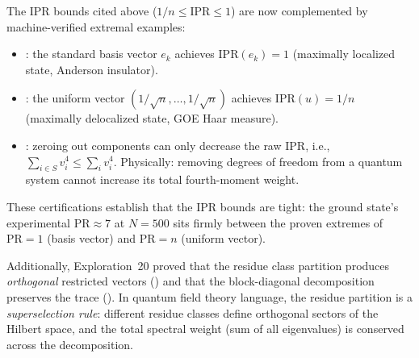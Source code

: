 \begin{remark}
The IPR bounds cited above ($1/n \leq \mathrm{IPR} \leq 1$) are
now complemented by machine-verified extremal examples:
\begin{itemize}
  \item {}: the standard basis vector $e_k$ achieves
    $\mathrm{IPR}(e_k) = 1$ (maximally localized state, Anderson insulator).
  \item {}: the uniform vector $(1/\sqrt{n}, \ldots, 1/\sqrt{n})$
    achieves $\mathrm{IPR}(u) = 1/n$ (maximally delocalized state, GOE Haar measure).
  \item {}: zeroing out components can only
    decrease the raw IPR, i.e., $\sum_{i \in S} v_i^4 \leq \sum_i v_i^4$.
    Physically: removing degrees of freedom from a quantum system
    cannot increase its total fourth-moment weight.
\end{itemize}
These certifications establish that the IPR bounds are tight:
the ground state's experimental $\mathrm{PR} \approx 7$ at $N = 500$
sits firmly between the proven extremes of $\mathrm{PR} = 1$
(basis vector) and $\mathrm{PR} = n$ (uniform vector).

Additionally, Exploration~20 proved that the residue class
partition produces \emph{orthogonal} restricted vectors
() and that the block-diagonal
decomposition preserves the trace
().
In quantum field theory language, the residue partition is a
\emph{superselection rule}: different residue classes define
orthogonal sectors of the Hilbert space, and the total spectral
weight (sum of all eigenvalues) is conserved across the
decomposition.
\end{remark}

